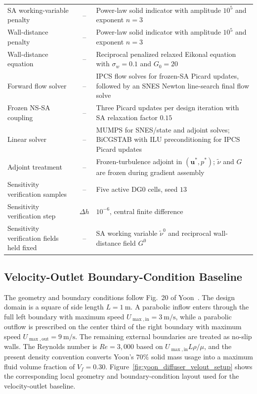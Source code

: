 \begin{table}[htbp]
\begin{tabularx}{\textwidth}{l c X}
		SA working-variable penalty & -- & Power-law solid indicator with amplitude $10^5$ and exponent $n=3$ \\
		Wall-distance penalty & -- & Power-law solid indicator with amplitude $10^5$ and exponent $n=3$ \\
		Wall-distance equation & -- & Reciprocal penalized relaxed Eikonal equation with $\sigma_w=0.1$ and $G_0=20$ \\
			Forward flow solver & -- & IPCS flow solves for frozen-SA Picard updates, followed by an SNES Newton line-search final flow solve \\
		Frozen NS-SA coupling & -- & Three Picard updates per design iteration with SA relaxation factor $0.15$ \\
			Linear solver & -- & MUMPS for SNES/state and adjoint solves; BiCGSTAB with ILU preconditioning for IPCS Picard updates \\
		Adjoint treatment & -- & Frozen-turbulence adjoint in $(\mathbf{u}^*,p^*)$; $\tilde{\nu}$ and $G$ are frozen during gradient assembly \\
		Sensitivity verification samples & -- & Five active DG0 cells, seed $13$ \\
		Sensitivity verification step & $\Delta h$ & $10^{-6}$, central finite difference \\
		Sensitivity verification fields held fixed & -- & SA working variable $\tilde{\nu}^{0}$ and reciprocal wall-distance field $G^{0}$ \\
		\hline
	\end{tabularx}
\end{table}

\subsection{Velocity-Outlet Boundary-Condition Baseline}
\label{subsec:app_C_yoon_diffuser_velocity_outlet}
The geometry and boundary conditions follow Fig.~20 of Yoon~\cite{Yoon2016}. The design domain is a square of side length $L=1~\mathrm{m}$. A parabolic inflow enters through the full left boundary with maximum speed $U_{\max,\mathrm{in}}=3~\mathrm{m/s}$, while a parabolic outflow is prescribed on the center third of the right boundary with maximum speed $U_{\max,\mathrm{out}}=9~\mathrm{m/s}$. The remaining external boundaries are treated as no-slip walls. The Reynolds number is $Re=3{,}000$ based on $U_{\max,\mathrm{in}}L\rho/\mu$, and the present density convention converts Yoon's $70\%$ solid mass usage into a maximum fluid volume fraction of $V_f=0.30$.
Figure~\ref{fig:yoon_diffuser_velout_setup} shows the corresponding local geometry and boundary-condition layout used for the velocity-outlet baseline.

